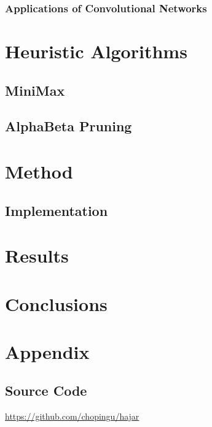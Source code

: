 \documentclass[titlepage]{article}
\begin{document}
\subsubsection{Applications of Convolutional Networks}

\newpage


\section{Heuristic Algorithms}
\subsection{MiniMax}
\subsection{AlphaBeta Pruning}

\newpage

\section{Method}

\subsection{Implementation}

\newpage

\section{Results}

\newpage

\section{Conclusions}

\newpage

\appendix

\section{Appendix}
\subsection{Source Code}

\centerline{\href{https://github.com/chopingu/hajar}{https://github.com/chopingu/hajar}}

\newpage



\end{document}
